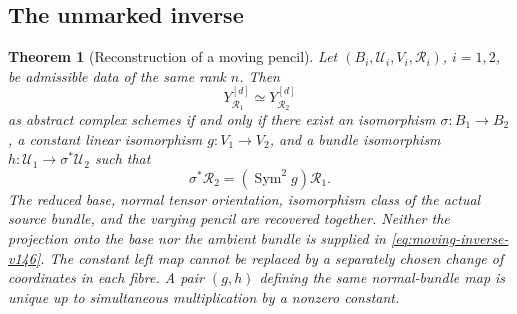 \documentclass[11pt,reqno]{amsart}
\numberwithin{equation}{section}
\newtheorem{theorem}{Theorem}[section]
\theoremstyle{definition}\newtheorem{definition}[theorem]{Definition}
\theoremstyle{remark}\newtheorem{remark}[theorem]{Remark}
\DeclareMathOperator{\Sym}{Sym}\DeclareMathOperator{\Gr}{Gr}
\begin{document}
\subsection{The unmarked inverse}
\begin{theorem}[Reconstruction of a moving pencil]
\label{thm:moving-reconstruction-v146}
Let \((B_i,\mathcal U_i,V_i,\mathcal R_i)\), \(i=1,2\), be admissible
data of the same rank \(n\).  Then
\begin{equation}\label{eq:moving-inverse-v146}
 Y_{\mathcal R_1}^{[d]}\simeq Y_{\mathcal R_2}^{[d]}
\end{equation}
as abstract complex schemes if and only if there exist an isomorphism
\(\sigma:B_1\to B_2\), a constant linear isomorphism
\(g:V_1\to V_2\), and a bundle isomorphism
\(h:\mathcal U_1\to\sigma^*\mathcal U_2\) such that
\begin{equation}\label{eq:moving-data-v146}
                  \sigma^*\mathcal R_2=(\Sym^2g)\mathcal R_1.
\end{equation}
The reduced base, normal tensor orientation, isomorphism class of the
actual source bundle, and the varying pencil are recovered together.
Neither the projection onto the base nor the ambient bundle is
supplied in \eqref{eq:moving-inverse-v146}.  The constant left map
cannot be replaced by a separately chosen change of coordinates in
each fibre.  A pair \((g,h)\) defining the same normal-bundle map is
unique up to simultaneous multiplication by a nonzero constant.
\end{theorem}
\end{document}
